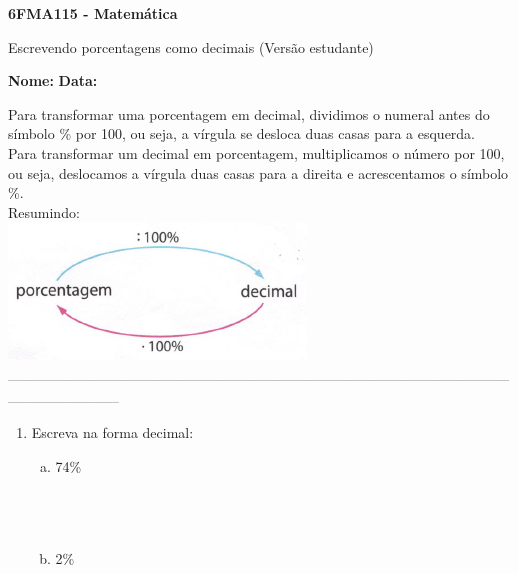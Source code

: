 \documentclass[a4paper,14pt]{article}
\begin{document}
	
	\noindent\textbf{6FMA115 - Matemática} 
	
	\begin{center}Escrevendo porcentagens como decimais (Versão estudante)
	\end{center}
	
	\noindent\textbf{Nome:} \underline{\hspace{10cm}}
	\noindent\textbf{Data:} \underline{\hspace{4cm}}
	
	
	\begin{multicols}{2}
		\noindent Para transformar uma porcentagem em decimal, dividimos o numeral antes do símbolo \% por 100, ou seja, a vírgula se desloca duas casas para a esquerda. \\
		Para transformar um decimal em porcentagem, multiplicamos o número por 100, ou seja, deslocamos a vírgula duas casas para a direita e acrescentamos o símbolo \%. \\
		Resumindo: \\
		\includegraphics[width=1\linewidth]{6FMA115_imagens/imagem1}
		\noindent\textsubscript{--------------------------------------------------------------------------------------------------------------------------------------------------------------}
		\begin{enumerate} 
			\item Escreva na forma decimal:
			\begin{enumerate}[a)]
				\item 74\% \\\\\\\\
				\item 2\% \\\\\\\\

\end{enumerate}
\end{enumerate}
\end{multicols}
\end{document}
